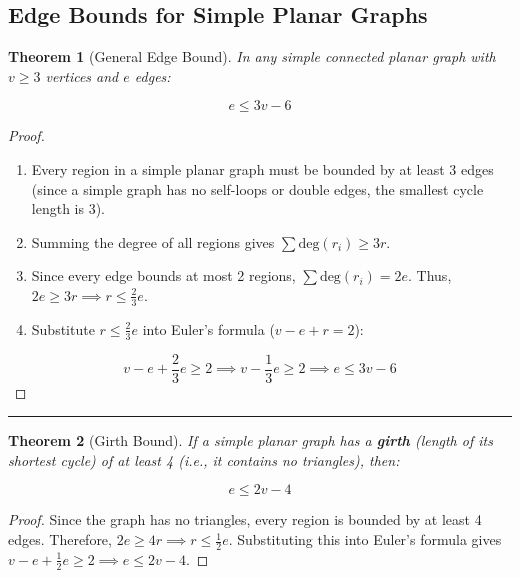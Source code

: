 \documentclass[
]{book}
\providecommand{\tightlist}{%
  \setlength{\itemsep}{0pt}\setlength{\parskip}{0pt}}
\newtheorem{theorem}{Theorem}[chapter]
\theoremstyle{definition}
\theoremstyle{definition}
\theoremstyle{definition}
\theoremstyle{definition}
\theoremstyle{remark}
\begin{document}
\subsection{Edge Bounds for Simple Planar Graphs}\label{edge-bounds-for-simple-planar-graphs}

\begin{theorem}[General Edge Bound]
\protect\hypertarget{thm:unnamed-chunk-25}{}\label{thm:unnamed-chunk-25}In any simple connected planar graph with \(v \ge 3\) vertices and \(e\) edges:

\[e \le 3v - 6\]
\end{theorem}

\begin{proof}
\leavevmode

\begin{enumerate}
\def\labelenumi{\arabic{enumi}.}
\tightlist
\item
  Every region in a simple planar graph must be bounded by at least 3 edges (since a simple graph has no self-loops or double edges, the smallest cycle length is 3).
\item
  Summing the degree of all regions gives \(\sum \text{deg}(r_i) \ge 3r\).
\item
  Since every edge bounds at most 2 regions, \(\sum \text{deg}(r_i) = 2e\). Thus, \(2e \ge 3r \implies r \le \frac{2}{3}e\).
\item
  Substitute \(r \le \frac{2}{3}e\) into Euler's formula (\(v - e + r = 2\)):
\end{enumerate}

\[v - e + \frac{2}{3}e \ge 2 \implies v - \frac{1}{3}e \ge 2 \implies e \le 3v - 6\]

\end{proof}

\begin{center}\rule{0.5\linewidth}{0.5pt}\end{center}

\begin{theorem}[Girth Bound]
\protect\hypertarget{thm:unnamed-chunk-27}{}\label{thm:unnamed-chunk-27}If a simple planar graph has a \textbf{girth} (length of its shortest cycle) of at least 4 (i.e., it contains no triangles), then:

\[e \le 2v - 4\]
\end{theorem}

\begin{proof}
Since the graph has no triangles, every region is bounded by at least 4 edges. Therefore, \(2e \ge 4r \implies r \le \frac{1}{2}e\).
Substituting this into Euler's formula gives \(v - e + \frac{1}{2}e \ge 2 \implies e \le 2v - 4\).
\end{proof}
\end{document}

